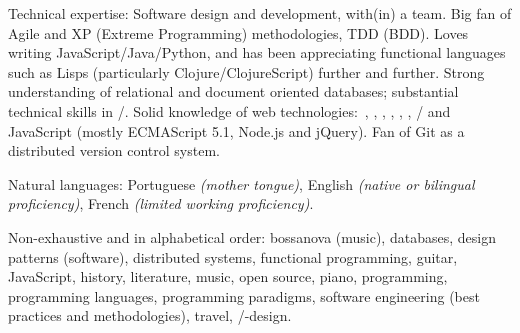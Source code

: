 \documentclass[10pt,a4paper]{article}
\begin{document}
\inlineheadsection  %
  {Technical expertise:}
  {Software design and development, with(in) a team.  Big fan of Agile and XP (Extreme Programming) methodologies, TDD (BDD).  Loves writing JavaScript/\nsp Java/\nsp Python, and has been appreciating functional languages such as Lisps (particularly Clojure/\nsp ClojureScript) further and further.  Strong understanding of relational and document oriented databases; substantial technical skills in /\nsp {}.  Solid knowledge of web technologies:\ , , , , , , /\nsp{} and JavaScript (mostly ECMAScript 5.1, Node.js and jQuery). Fan of Git as a distributed version control system.}

\vspace{0.5em}
\inlineheadsection
  {Natural languages:}
  {Portuguese \emph{(mother tongue)}, English \emph{(native or bilingual proficiency)}, French \emph{(limited working proficiency)}.}


\spacedhrule{1.6em}{-0.4em}


\inlineheadsection
  {Non-exhaustive and in alphabetical order:}
  {bossanova (music), databases, design patterns (software), distributed systems, functional programming, guitar, JavaScript, history, literature, music, open source, piano, programming, programming languages, programming paradigms, software engineering (best practices and methodologies), travel, /-design.}
\end{document}
